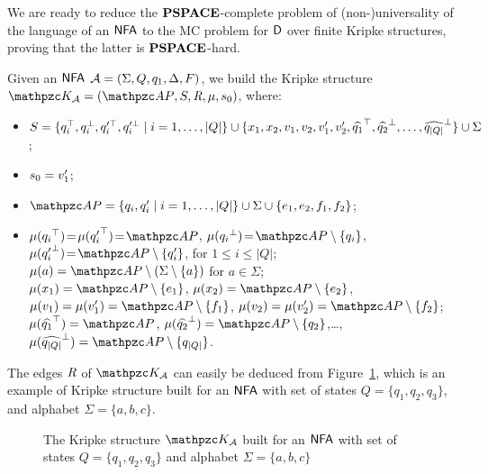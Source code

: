 We are ready to reduce the $\textbf{PSPACE}$-complete problem of (non-)universality of the language of an $\text{\sffamily NFA}$ to the MC problem for $\mathsf{D}${} over finite Kripke structures, proving that the latter is $\textbf{PSPACE}$-hard.

Given an $\text{\sffamily NFA}$ $\mathcal{A} =(\Sigma,Q,q_1,\Delta,F)$, we build the Kripke structure $\Ku_\Au=\KuDef$, where:
\begin{itemize}
    \item $S=\{q_i^\top,q_i^\bot,q_i'^\top,q_i'^\bot\mid i=1,\ldots, |Q|\}\cup\{x_1,x_2,v_1,v_2,v'_1,v'_2,\widehat{q_1}^\top,\widehat{q_2}^\bot,\ldots,\allowbreak \widehat{q_{|Q|}}^\bot\}\cup\Sigma$;
    \item $s_0=v_1'$;
    \item $\AP=\{q_i,q_i'\mid i=1,\ldots, |Q|\}\cup\Sigma\cup\{e_1,e_2,f_1,f_2\}$;  
    \item $\Lab({q_i}^\top)\!=\!\Lab({q_i'}^\top)\!=\!\AP$, $\Lab({q_i}^\bot)\!=\!\AP\setminus\{q_i\}$, $\Lab({q'_i}^\bot)\!=\!\AP\setminus\{q_i'\}$, for $1\leq i\leq |Q|$;\\
    $\Lab(a)=\AP\setminus(\Sigma\setminus\{a\})$ for $a\in\Sigma$;\\
    $\Lab(x_1)=\AP\setminus\{e_1\}$, $\Lab(x_2)=\AP\setminus\{e_2\}$, $\Lab(v_1)=\Lab(v_1')=\AP\setminus\{f_1\}$,
    $\Lab(v_2)=\Lab(v_2')=\AP\setminus\{f_2\}$;\\ $\Lab(\widehat{q_1}^\top)=\AP$,
    $\Lab(\widehat{q_2}^\bot)=\AP\setminus\{q_2\}$,\dots , $\Lab(\widehat{q_{|Q|}}^\bot)=\AP\setminus\{q_{|Q|}\}$.
\end{itemize}

The edges $\textit{R}$ of $\Ku_\Au$ can easily be deduced from Figure~\ref{fig:HardKu}, which is an example of Kripke structure built for an $\text{\sffamily NFA}$ with set of states $Q=\{q_1,q_2,q_3\}$, and alphabet $\Sigma=\{a,b,c\}$.

\begin{sidewaysfigure}
    \centering
    \resizebox{0.96\textwidth}{!}{}
    \caption{The Kripke structure $\Ku_\Au$ built for an $\text{\sffamily NFA}$ with set of states $Q=\{q_1,q_2,q_3\}$  and alphabet $\Sigma=\{a,b,c\}$}
    \label{fig:HardKu}
\end{sidewaysfigure}

